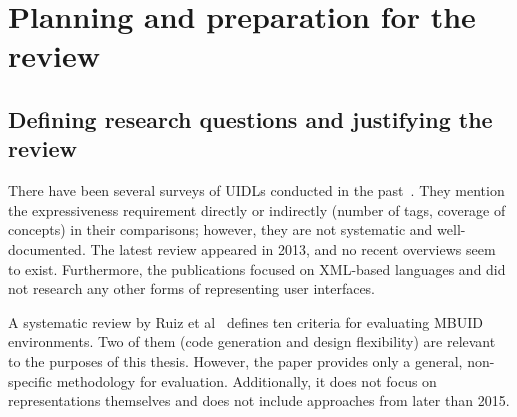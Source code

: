 \section[Planning and preparation]{Planning and preparation for the review}\label{sec:planning-and-preparation-for-review}

\subsection{Defining research questions and justifying the review}\label{subsec:defining-research-questions-and-justifying-the-review}

There have been several surveys of UIDLs conducted in the past~\cite{Souchon2003, guerrero_garcia_theoretical_2009, guerrero_garcia_theoretical_2011, Jovanovic2013}.
They mention the expressiveness requirement directly or indirectly (number of tags, coverage of concepts) in their comparisons;
however, they are not systematic and well-documented.
The latest review appeared in 2013, and no recent overviews seem to exist.
Furthermore, the publications focused on XML-based languages and did not research any other forms of representing user interfaces.

A systematic review by Ruiz et al~\cite{Ruiz2018} defines ten criteria for evaluating MBUID environments.
Two of them (code generation and design flexibility) are relevant to the purposes of this thesis.
However, the paper provides only a general, non-specific methodology for evaluation.
Additionally, it does not focus on representations themselves and does not include approaches from later than 2015.

